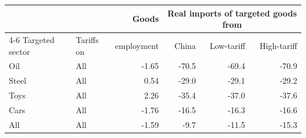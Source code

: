\begin{tabular}{llrrrr}
\toprule
 & & Goods & \multicolumn{3}{c}{Real imports of targeted goods from} \\
\cmidrule(lr){4-6}
Targeted sector & Tariffs on & employment & China & Low-tariff & High-tariff \\
\midrule
Oil & All & -1.65 & -70.5 & -69.4 & -70.9 \\
\midrule
Steel & All & 0.54 & -29.0 & -29.1 & -29.2 \\
\midrule
Toys & All & 2.26 & -35.4 & -37.0 & -37.6 \\
\midrule
Cars & All & -1.76 & -16.5 & -16.3 & -16.6 \\
\midrule
All & All & -1.59 & -9.7 & -11.5 & -15.3 \\
\bottomrule
\end{tabular}
